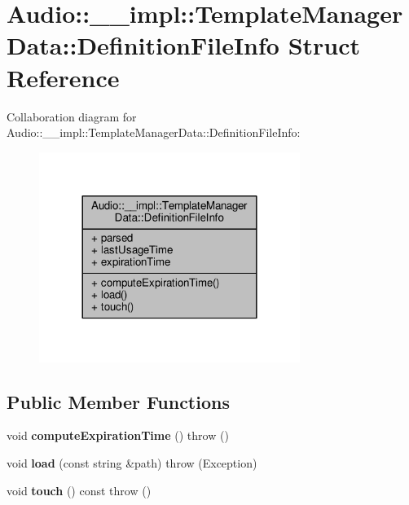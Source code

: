 \hypertarget{structAudio_1_1____impl_1_1TemplateManagerData_1_1DefinitionFileInfo}{}\section{Audio\+:\+:\+\_\+\+\_\+impl\+:\+:Template\+Manager\+Data\+:\+:Definition\+File\+Info Struct Reference}
\label{structAudio_1_1____impl_1_1TemplateManagerData_1_1DefinitionFileInfo}


Collaboration diagram for Audio\+:\+:\+\_\+\+\_\+impl\+:\+:Template\+Manager\+Data\+:\+:Definition\+File\+Info\+:
\nopagebreak
\begin{figure}[H]
\begin{center}
\leavevmode
\includegraphics[width=240pt]{d8/d7a/structAudio_1_1____impl_1_1TemplateManagerData_1_1DefinitionFileInfo__coll__graph}
\end{center}
\end{figure}
\subsection*{Public Member Functions}
\begin{DoxyCompactItemize}
\item 
void {\bfseries compute\+Expiration\+Time} ()  throw ()\hypertarget{structAudio_1_1____impl_1_1TemplateManagerData_1_1DefinitionFileInfo_a120a1ca75b1fdc0682c496f8ca17dc86}{}\label{structAudio_1_1____impl_1_1TemplateManagerData_1_1DefinitionFileInfo_a120a1ca75b1fdc0682c496f8ca17dc86}

\item 
void {\bfseries load} (const string \&path)  throw (\+Exception)\hypertarget{structAudio_1_1____impl_1_1TemplateManagerData_1_1DefinitionFileInfo_a2fab7dc3b2c48fb1685fb3ab2422d925}{}\label{structAudio_1_1____impl_1_1TemplateManagerData_1_1DefinitionFileInfo_a2fab7dc3b2c48fb1685fb3ab2422d925}

\item 
void {\bfseries touch} () const   throw ()\hypertarget{structAudio_1_1____impl_1_1TemplateManagerData_1_1DefinitionFileInfo_af9fbfbad9b7164b548094772682a83d4}{}\label{structAudio_1_1____impl_1_1TemplateManagerData_1_1DefinitionFileInfo_af9fbfbad9b7164b548094772682a83d4}

\end{DoxyCompactItemize}
